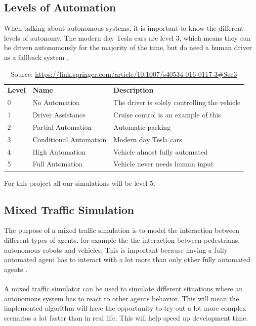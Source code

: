 \subsection{Levels of Automation}
When talking about autonomous systems, it is important to know the different levels of autonomy. The modern day Tesla cars are level 3, which means they can be driven autonomously for the majority of the time, but do need a human driver as a fallback system \cite{teslaSelf, Bagloee2016}.
\begin{table}[H]
\begin{tabular}{lll}
\textbf{Level} & \textbf{Name}                   & \textbf{Description} \\
0     & No Automation          & The driver is solely controlling the vehicle\\
1     & Driver Assistance      & Cruise control is an example of this             \\
2     & Partial Automation     & Automatic parking            \\
3     & Conditional Automation & Modern day Tesla cars            \\
4     & High Automation        & Vehicle almost fully automated           \\
5     & Full Automation        & Vehicle never needs human input
\end{tabular}
\caption{Source: \url{https://link.springer.com/article/10.1007/s40534-016-0117-3\#Sec3}}
\end{table}

For this project all our simulations will be level 5. 

\subsection{Mixed Traffic Simulation}
The purpose of a mixed traffic simulation is to model the interaction between different types of agents, for example the the interaction between pedestrians, autonomous robots and vehicles. This is important because having a fully automated agent has to interact with a lot more than only other fully automated agents \cite{KernerBorisS2021Eoad}. 
\\~\\
A mixed traffic simulator can be used to simulate different situations where an autonomous system has to react to other agents behavior. This will mean the implemented algorithm will have the opportunity to try out a lot more complex scenarios a lot faster than in real life. This will help speed up development time. 


